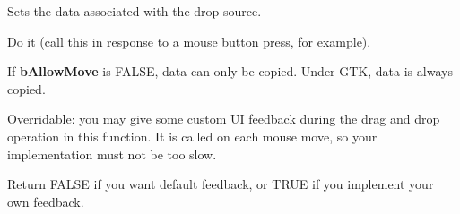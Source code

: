 \label{wxdropsourcedtor}


\label{wxdropsourcesetdata}


Sets the data  associated with the drop source.

\label{wxdropsourcedodragdrop}


Do it (call this in response to a mouse button press, for example).

If {\bf bAllowMove} is FALSE, data can only be copied. Under GTK, data
is always copied.

\label{wxdropsourcegivefeedback}


Overridable: you may give some custom UI feedback during the drag and drop operation
in this function. It is called on each mouse move, so your implementation must not be too
slow.





Return FALSE if you want default feedback, or TRUE if you implement your own
feedback.

